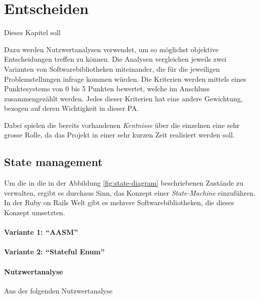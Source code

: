 \chapter{Entscheiden} \label{ch:decide}

Dieses Kapitel soll

Dazu werden Nutzwertanalysen verwendet, um so möglichst objektive Entscheidungen treffen zu können. Die Analysen vergleichen jeweils
zwei Varianten von Softwarebibliotheken miteinander, die für die jeweiligen Problemstellungen infrage kommen würden. Die Kriterien werden
mittels eines Punktesystems von 0 bis 5 Punkten bewertet, welche im Anschluss zusammengezählt werden.
Jedes dieser Kriterien hat eine andere Gewichtung, bezogen auf deren Wichtigkeit in dieser PA.

Dabei spielen die bereits vorhandenen \emph{Kentnisse} über die einzelnen eine sehr grosse Rolle, da das Projekt in einer sehr kurzen Zeit realisiert werden soll.

\section{State management}
Um die in die in der  Abbildung \ref{fig:state-diagram} beschriebenen Zustände zu verwalten,
ergibt es durchaus Sinn, das Konzept einer \emph{State-Machine} einzuführen. In der Ruby on Rails Welt
gibt es mehrere Softwarebibliotheken, die dieses Konzept umsetzten.

\subsubsection{Variante 1: \enquote{AASM}}

\subsubsection{Variante 2: \enquote{Stateful Enum}}

\subsubsection{Nutzwertanalyse}

Aus der folgenden Nutzwertanalyse

